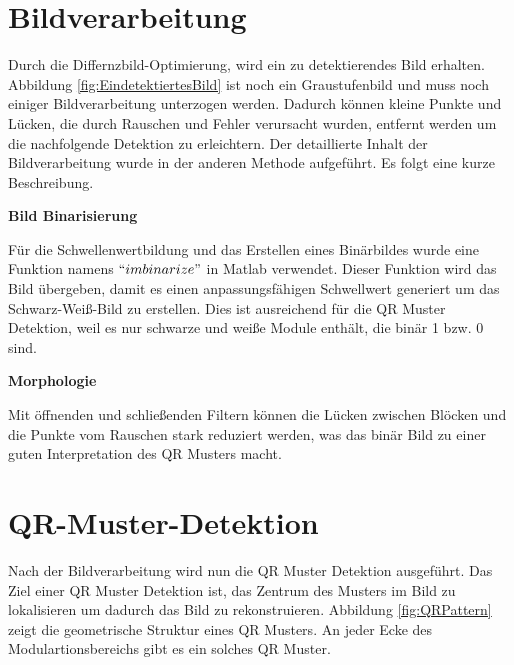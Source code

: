 \section{Bildverarbeitung} 
Durch die Differnzbild-Optimierung, wird ein zu detektierendes Bild erhalten. Abbildung \ref{fig:EindetektiertesBild} ist noch ein Graustufenbild und muss noch einiger Bildverarbeitung unterzogen werden. Dadurch können kleine Punkte und Lücken, die durch Rauschen und Fehler verursacht wurden, entfernt werden um die nachfolgende Detektion zu erleichtern. Der detaillierte Inhalt der Bildverarbeitung wurde in der anderen Methode aufgeführt. Es folgt eine kurze Beschreibung. 

\textbf{Bild Binarisierung}

Für die Schwellenwertbildung und das Erstellen eines Binärbildes wurde eine Funktion namens $ ``imbinarize" $ in Matlab verwendet. Dieser Funktion wird das Bild übergeben, damit es einen anpassungsfähigen Schwellwert generiert um das Schwarz-Weiß-Bild zu erstellen. Dies ist ausreichend für die QR Muster Detektion, weil es nur schwarze und weiße Module enthält, die binär 1 bzw. 0 sind. 



\textbf{Morphologie}

Mit öffnenden und schließenden Filtern können die Lücken zwischen Blöcken und die Punkte vom Rauschen stark reduziert werden, was das binär Bild zu einer guten Interpretation des QR Musters macht. 

\section{QR-Muster-Detektion} 

Nach der Bildverarbeitung wird nun die QR Muster Detektion ausgeführt. Das Ziel einer QR Muster Detektion ist, das Zentrum des Musters im Bild zu lokalisieren um dadurch das Bild zu rekonstruieren. Abbildung \ref{fig:QRPattern} zeigt die geometrische Struktur eines QR Musters. An jeder Ecke des Modulartionsbereichs gibt es ein solches QR Muster.

